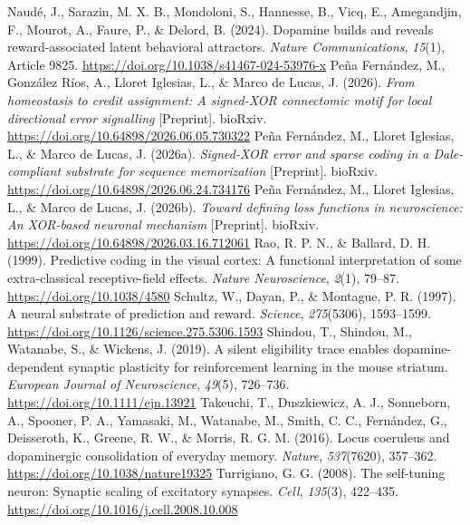 \documentclass[11pt,a4paper]{article}
\begin{document}
\begin{thebibliography}{}
 Naud\'e, J., Sarazin, M. X. B., Mondoloni, S., Hannesse, B., Vicq, E., Amegandjin, F., Mourot, A., Faure, P., \& Delord, B. (2024). Dopamine builds and reveals reward-associated latent behavioral attractors. \emph{Nature Communications}, \emph{15}(1), Article 9825. \url{https://doi.org/10.1038/s41467-024-53976-x}
 Pe\~na Fern\'andez, M., Gonz\'alez R\'ios, A., Lloret Iglesias, L., \& Marco de Lucas, J. (2026). \emph{From homeostasis to credit assignment: A signed-XOR connectomic motif for local directional error signalling} [Preprint]. bioRxiv. \url{https://doi.org/10.64898/2026.06.05.730322}
 Pe\~na Fern\'andez, M., Lloret Iglesias, L., \& Marco de Lucas, J. (2026a). \emph{Signed-XOR error and sparse coding in a Dale-compliant substrate for sequence memorization} [Preprint]. bioRxiv. \url{https://doi.org/10.64898/2026.06.24.734176}
 Pe\~na Fern\'andez, M., Lloret Iglesias, L., \& Marco de Lucas, J. (2026b). \emph{Toward defining loss functions in neuroscience: An XOR-based neuronal mechanism} [Preprint]. bioRxiv. \url{https://doi.org/10.64898/2026.03.16.712061}
 Rao, R. P. N., \& Ballard, D. H. (1999). Predictive coding in the visual cortex: A functional interpretation of some extra-classical receptive-field effects. \emph{Nature Neuroscience}, \emph{2}(1), 79--87. \url{https://doi.org/10.1038/4580}
 Schultz, W., Dayan, P., \& Montague, P. R. (1997). A neural substrate of prediction and reward. \emph{Science}, \emph{275}(5306), 1593--1599. \url{https://doi.org/10.1126/science.275.5306.1593}
 Shindou, T., Shindou, M., Watanabe, S., \& Wickens, J. (2019). A silent eligibility trace enables dopamine-dependent synaptic plasticity for reinforcement learning in the mouse striatum. \emph{European Journal of Neuroscience}, \emph{49}(5), 726--736. \url{https://doi.org/10.1111/ejn.13921}
 Takeuchi, T., Duszkiewicz, A. J., Sonneborn, A., Spooner, P. A., Yamasaki, M., Watanabe, M., Smith, C. C., Fern\'andez, G., Deisseroth, K., Greene, R. W., \& Morris, R. G. M. (2016). Locus coeruleus and dopaminergic consolidation of everyday memory. \emph{Nature}, \emph{537}(7620), 357--362. \url{https://doi.org/10.1038/nature19325}
 Turrigiano, G. G. (2008). The self-tuning neuron: Synaptic scaling of excitatory synapses. \emph{Cell}, \emph{135}(3), 422--435. \url{https://doi.org/10.1016/j.cell.2008.10.008}

\end{thebibliography}
\end{document}

